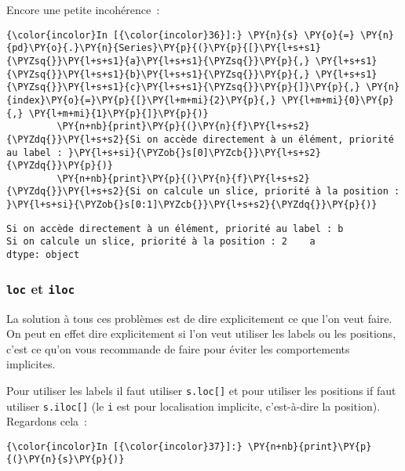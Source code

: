Encore une petite incohérence~:

    \begin{Verbatim}[commandchars=\\\{\},frame=single,framerule=0.3mm,rulecolor=\color{cellframecolor}]
{\color{incolor}In [{\color{incolor}36}]:} \PY{n}{s} \PY{o}{=} \PY{n}{pd}\PY{o}{.}\PY{n}{Series}\PY{p}{(}\PY{p}{[}\PY{l+s+s1}{\PYZsq{}}\PY{l+s+s1}{a}\PY{l+s+s1}{\PYZsq{}}\PY{p}{,} \PY{l+s+s1}{\PYZsq{}}\PY{l+s+s1}{b}\PY{l+s+s1}{\PYZsq{}}\PY{p}{,} \PY{l+s+s1}{\PYZsq{}}\PY{l+s+s1}{c}\PY{l+s+s1}{\PYZsq{}}\PY{p}{]}\PY{p}{,} \PY{n}{index}\PY{o}{=}\PY{p}{[}\PY{l+m+mi}{2}\PY{p}{,} \PY{l+m+mi}{0}\PY{p}{,} \PY{l+m+mi}{1}\PY{p}{]}\PY{p}{)}
         \PY{n+nb}{print}\PY{p}{(}\PY{n}{f}\PY{l+s+s2}{\PYZdq{}}\PY{l+s+s2}{Si on accède directement à un élément, priorité au label : }\PY{l+s+si}{\PYZob{}s[0]\PYZcb{}}\PY{l+s+s2}{\PYZdq{}}\PY{p}{)}
         \PY{n+nb}{print}\PY{p}{(}\PY{n}{f}\PY{l+s+s2}{\PYZdq{}}\PY{l+s+s2}{Si on calcule un slice, priorité à la position : }\PY{l+s+si}{\PYZob{}s[0:1]\PYZcb{}}\PY{l+s+s2}{\PYZdq{}}\PY{p}{)}
\end{Verbatim}


    \begin{Verbatim}[commandchars=\\\{\},frame=single,framerule=0.3mm,rulecolor=\color{cellframecolor}]
Si on accède directement à un élément, priorité au label : b
Si on calcule un slice, priorité à la position : 2    a
dtype: object
\end{Verbatim}

    \hypertarget{loc-et-iloc}{%
\subsubsection{\texorpdfstring{\texttt{loc} et
\texttt{iloc}}{loc et iloc}}\label{loc-et-iloc}}

    La solution à tous ces problèmes est de dire explicitement ce que l'on
veut faire. On peut en effet dire explicitement si l'on veut utiliser
les labels ou les positions, c'est ce qu'on vous recommande de faire
pour éviter les comportements implicites.

Pour utiliser les labels il faut utiliser \texttt{s.loc{[}{]}} et pour
utiliser les positions if faut utiliser \texttt{s.iloc{[}{]}} (le
\texttt{i} est pour localisation implicite, c'est-à-dire la position).
Regardons cela~:

    \begin{Verbatim}[commandchars=\\\{\},frame=single,framerule=0.3mm,rulecolor=\color{cellframecolor}]
{\color{incolor}In [{\color{incolor}37}]:} \PY{n+nb}{print}\PY{p}{(}\PY{n}{s}\PY{p}{)}
\end{Verbatim}


